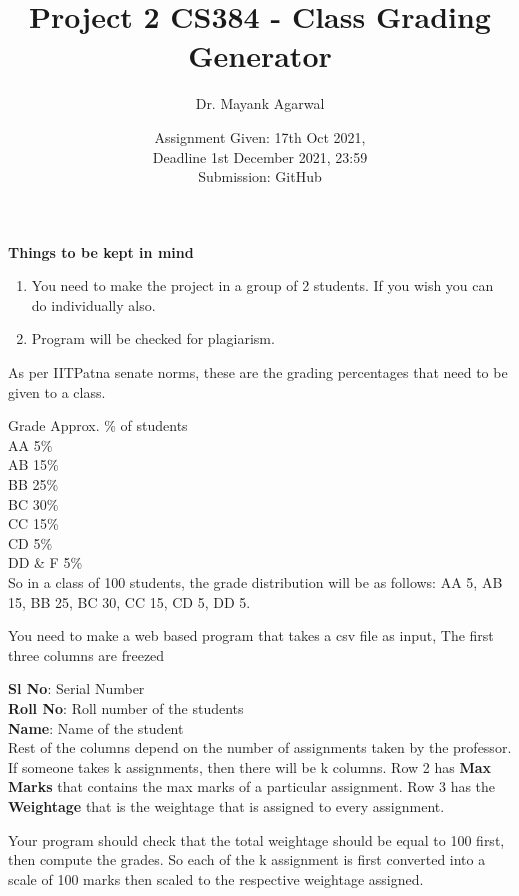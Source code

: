 \documentclass{article}
\title{Project 2 CS384 -  Class Grading Generator}
\author{Dr. Mayank Agarwal}
\date{Assignment Given: 17th Oct 2021,\\ Deadline 1st December 2021,  
23:59\\Submission: GitHub }
\begin{document}
	\maketitle  
	\textbf{Things to be kept in mind} 
	\begin{enumerate}
\item You need to make the project in a group of 2 students. If you wish you 
can do individually also.  
\item Program will be checked for plagiarism.   
\end{enumerate}

As per IITPatna senate norms, these are the grading percentages that need to be 
given to a class. 

Grade Approx. \% of  students\\
AA 5\%  \\
AB 15\%  \\
BB 25\%  \\
BC 30\%  \\
CC 15\%  \\
CD 5\%  \\
DD \&   F 5\%   \\

So in a class of 100 students, the grade distribution will be as follows: 
AA 5,
AB 15,
BB 25,
BC 30,
CC 15,
CD 5,
DD 5.  

You need to make a web based program that takes a csv file as input, 
The first three columns are freezed 

\noindent \textbf{Sl No}: Serial Number \\
	\textbf{Roll No}: Roll number of the students\\
		\textbf{Name}: Name of the student\\ 

Rest of the columns depend on the number of assignments taken by the professor. 
If someone takes k assignments, then there will be k columns. 
Row 2 has \textbf{Max Marks} that contains the max marks of a particular 
assignment. Row 3 has the \textbf{Weightage} that is the weightage that is 
assigned to every assignment. 

Your program should check that the total weightage should be equal to 100 
first, then compute the grades. So each of the k assignment is first converted 
into a scale of 100 marks then scaled to the respective weightage assigned. 



 
\end{document}
